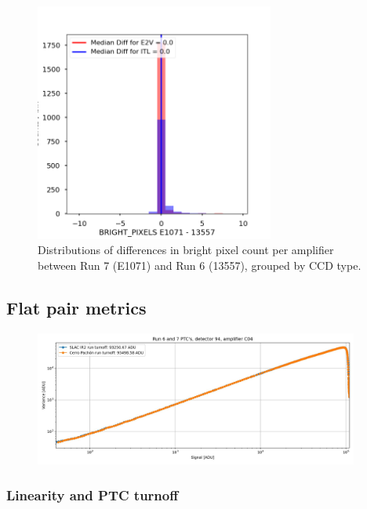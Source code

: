 \begin{figure}[H]
\begin{centering}
\includegraphics[width=0.7\textwidth]{figures/baselineCharacterization/BRIGHT_PIXELS_13557_E1071_diff.png}
\caption{Distributions of differences in bright pixel count per amplifier between Run 7 (E1071) and Run 6 (13557), grouped by CCD type.}
\label{fig:dark-dist}
\end{centering}
\end{figure}

\subsection{Flat pair metrics}\label{flat-pair-metrics}

\begin{figure}[H]
\begin{centering}
\includegraphics[width=0.95\textwidth]{figures/baselineCharacterization/run7PTCsToDate.jpg}
\end{centering}
\end{figure}

\subsubsection{Linearity and PTC turnoff}\label{linearity-and-ptc-turnoff}

